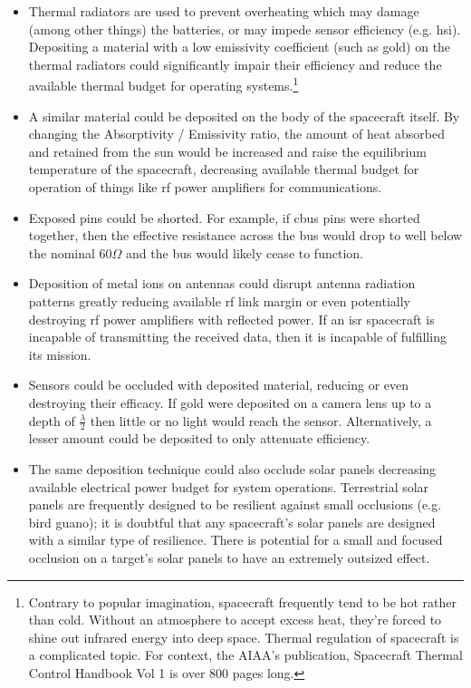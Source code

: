 \begin{itemize}

\item Thermal radiators are used to prevent overheating which may
  damage (among other things) the batteries, or may impede sensor
  efficiency (e.g. \acf{hsi}).  Depositing a material with a low
  emissivity coefficient (such as gold) on the thermal radiators could
  significantly impair their efficiency and reduce the available
  thermal budget for operating systems.\footnote{Contrary to popular
  imagination, spacecraft frequently tend to be hot rather than cold.
  Without an atmosphere to accept excess heat, they're forced to shine
  out infrared energy into deep space.  Thermal regulation of
  spacecraft is a complicated topic.  For context, the AIAA's
  publication, Spacecraft Thermal Control Handbook Vol 1
  \cite{thermals} is over 800 pages long.}

\item A similar material could be deposited on the body of the
  spacecraft itself.  By changing the Absorptivity / Emissivity ratio,
  the amount of heat absorbed and retained from the sun would be
  increased and raise the equilibrium temperature of the spacecraft,
  decreasing available thermal budget for operation of things like
  \ac{rf} power amplifiers for communications.

\item Exposed pins could be shorted.  For example, if \ac{cbus} pins
  were shorted together, then the effective resistance across the bus
  would drop to well below the nominal $60\Omega$ and the bus would
  likely cease to function.

\item Deposition of metal ions on antennas could disrupt antenna
  radiation patterns greatly reducing available \ac{rf} link margin or
  even potentially destroying \ac{rf} power amplifiers with reflected
  power.  If an \ac{isr} spacecraft is incapable of transmitting the
  received data, then it is incapable of fulfilling its mission.

\item Sensors could be occluded with deposited material, reducing or
  even destroying their efficacy.  If gold were deposited on a camera
  lens up to a depth of $\frac{\lambda}{2}$ then little or no light
  would reach the sensor.  Alternatively, a lesser amount could be
  deposited to only attenuate efficiency.
  
\item The same deposition technique could also occlude solar panels
  decreasing available electrical power budget for system operations.
  Terrestrial solar panels are frequently designed to be resilient
  against small occlusions (e.g. bird guano); it is doubtful that any
  spacecraft's solar panels are designed with a similar type of
  resilience.  There is potential for a small and focused occlusion on
  a target's solar panels to have an extremely outsized effect.


\end{itemize}
